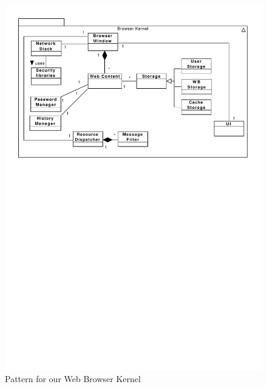 \documentclass[prodmode,hillsideplop]{acmlarge}
\begin{document}
\begin{figure}[h!t]
  \vspace*{-0.5cm}
  \centering
  \includegraphics[scale=0.7]{imgs/WBK.pdf}
  \vspace{-11.5cm}
  \caption{Pattern for our Web Browser Kernel}
  \label{fig:BK}
\end{figure}
\end{document}
